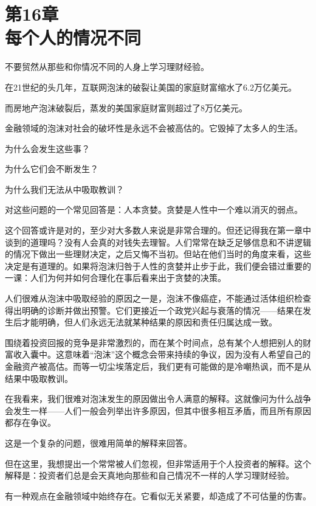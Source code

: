 
\section[第16章\q 每个人的情况不同]{第16章\\ 每个人的情况不同}

{\kaishu

不要贸然从那些和你情况不同的人身上学习理财经验。

}

在21世纪的头几年，互联网泡沫的破裂让美国的家庭财富缩水了6.2万亿美元。

而房地产泡沫破裂后，蒸发的美国家庭财富则超过了8万亿美元。

金融领域的泡沫对社会的破坏性是永远不会被高估的。它毁掉了太多人的生活。

为什么会发生这些事？

为什么它们会不断发生？

为什么我们无法从中吸取教训？

对这些问题的一个常见回答是：人本贪婪。贪婪是人性中一个难以消灭的弱点。

这个回答或许是对的，至少对大多数人来说是非常合理的。但还记得我在第一章中谈到的道理吗？没有人会真的对钱失去理智。人们常常在缺乏足够信息和不讲逻辑的情况下做出一些理财决定，之后又悔不当初。但站在他们当时的角度来看，这些决定是有道理的。如果将泡沫归咎于人性的贪婪并止步于此，我们便会错过重要的一课：人们为何并如何合理化在事后看来出于贪婪的决策。

人们很难从泡沫中吸取经验的原因之一是，泡沫不像癌症，不能通过活体组织检查得出明确的诊断并做出预警。它们更接近一个政党兴起与衰落的情况——结果在发生后才能明确，但人们永远无法就某种结果的原因和责任归属达成一致。

围绕着投资回报的竞争是非常激烈的，而在某个时间点，总有某个人想把别人的财富收入囊中。这意味着“泡沫”这个概念会带来持续的争议，因为没有人希望自己的金融资产被高估。而等一切尘埃落定后，我们更有可能做的是冷嘲热讽，而不是从结果中吸取教训。

在我看来，我们很难对泡沫发生的原因做出令人满意的解释。这就像问为什么战争会发生一样——人们一般会列举出许多原因，但其中很多相互矛盾，而且所有原因都存在争议。

这是一个复杂的问题，很难用简单的解释来回答。

但在这里，我想提出一个常常被人们忽视，但非常适用于个人投资者的解释。这个解释是：投资者们总是会天真地向那些和自己情况不一样的人学习理财经验。

有一种观点在金融领域中始终存在。它看似无关紧要，却造成了不可估量的伤害。

